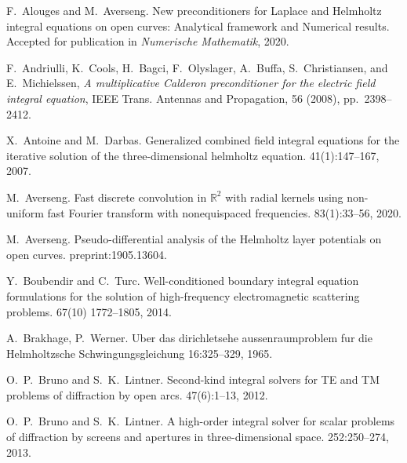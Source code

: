 \documentclass[]{report}
\begin{document}
\begin{small}
	\begin{thebibliography}{0}
		
		F.~Alouges and M.~Averseng.
		\newblock New preconditioners for Laplace and Helmholtz integral equations on open curves: Analytical framework and Numerical results. 
		\newblock Accepted for publication in {\em Numerische Mathematik}, 2020.

{\sc F.~Andriulli, K.~Cools, H.~Bagci, F.~Olyslager, A.~Buffa, S.~Christiansen,
  and E.~Michielssen}, {\em A multiplicative {C}alderon preconditioner for the
  electric field integral equation}, IEEE Trans. Antennas and Propagation, 56
  (2008), pp.~2398--2412.
                
		X.~Antoine and M.~Darbas.
		\newblock Generalized combined field integral equations for the iterative
		solution of the three-dimensional helmholtz equation.
		41(1):147--167, 2007.
		
		M.~Averseng.
		\newblock Fast discrete convolution in $\mathbb {R}^{2} $ with radial kernels using non-uniform fast Fourier transform with nonequispaced frequencies. 
		 83(1):33--56, 2020.
		
		M.~Averseng. 
		\newblock Pseudo-differential analysis of the Helmholtz layer potentials on open curves. 
		 preprint:1905.13604.
		
		Y.~Boubendir and C.~Turc.
		\newblock Well-conditioned boundary integral equation formulations for the solution of high-frequency electromagnetic scattering problems.
		 67(10) 1772--1805, 2014.
		
		A.~Brakhage, P.~Werner.
		\newblock Uber das dirichletsehe aussenraumproblem fur die Helmholtzsche Schwingungsgleichung
		 16:325–329, 1965.
		
		O.~P.~Bruno and S.~K.~Lintner.
		\newblock Second-kind integral solvers for TE and TM problems of diffraction by open arcs.
		 47(6):1--13, 2012.
		
		O.~P.~Bruno and S.~K.~Lintner.
		A high-order integral solver for scalar problems of diffraction by screens and apertures in three-dimensional space.
		 252:250--274, 2013.


\end{thebibliography}
\end{small}
\end{document}
